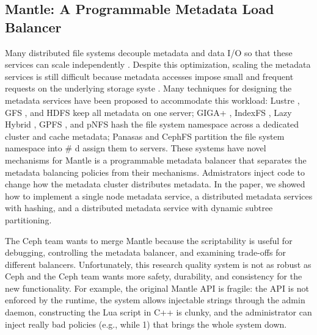 \documentclass[10pt,twocolumn]{article}
\begin{document}
\subsection{Mantle: A Programmable Metadata Load
Balancer}\label{mantle-a-programmable-metadata-load-balancer}

Many distributed file systems decouple metadata and data I/O so that
these services can scale independently \autocites[
]{alam:pdsw2011-metadata-scaling}[ ]{ghemawat:sosp2003-gfs}[
]{hildebrand:msst2005-pnfs}[ ]{weil_ceph_2006}[
]{welch:fast2008-panasas}{shvachko:login2012-hdfs-scalability}. Despite
this optimization, scaling the metadata services is still difficult
because metadata accesses impose small and frequent requests on the
underlying storage syste \autocite{roselli:atec2000-FS-workloads}. Many
techniques for designing the metadata services have been proposed to
accommodate this workload: Lustre
\autocite{konstantinos:pdsw2014-lustre-metadata}, GFS
\autocite{ghemawat:sosp2003-gfs}, and HDFS
\autocite{shvachko:login2012-hdfs-scalability} keep all metadata on one
server; GIGA+ \autocite{patil:fast2011-giga}, IndexFS
\autocite{ren:sc2014-indexfs}, Lazy Hybrid
\autocite{brandt:msst2003-lh}, GPFS \autocite{schmuck:fast2002-gpfs},
and pNFS \autocite{hildebrand:supercomputing2006-pNFS} hash the file
system namespace across a dedicated cluster and cache metadata; Panasas
\autocite{welch:fast2008-panasas} and CephFS
\autocite{weil:sc2004-dyn-metadata} partition the file system namespace
into \# d assign them to servers. These systems have novel mechanisms
for Mantle \autocite{sevilla:sc15-mantle} is a programmable metadata
balancer that separates the metadata balancing policies from their
mechanisms. Admistrators inject code to change how the metadata cluster
distributes metadata. In the paper, we showed how to implement a single
node metadata service, a distributed metadata services with hashing, and
a distributed metadata service with dynamic subtree partitioning.

The Ceph team wants to merge Mantle because the scriptability is useful
for debugging, controlling the metadata balancer, and examining
trade-offs for different balancers. Unfortunately, this research quality
system is not as robust as Ceph and the Ceph team wants more safety,
durability, and consistency for the new functionality. For example, the
original Mantle API is fragile: the API is not enforced by the runtime,
the system allows injectable strings through the admin daemon,
constructing the Lua script in C++ is clunky, and the administrator can
inject really bad policies (e.g., while 1) that brings the whole system
down.
\end{document}
